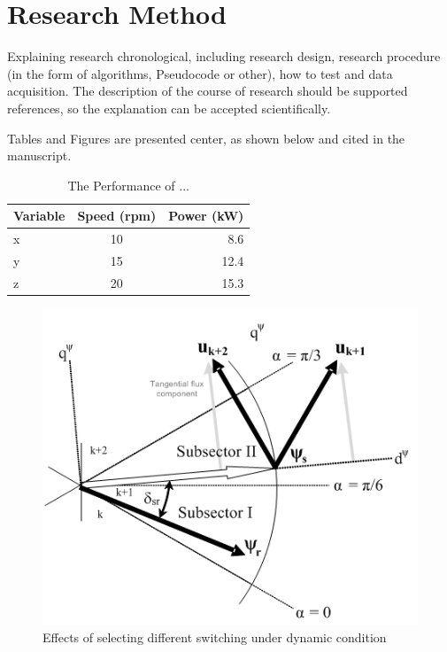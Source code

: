 \section{Research Method}
\label{ResearchMethod}
Explaining research chronological, including research design, research procedure (in the form of algorithms, Pseudocode or other), how to test and data acquisition. The description of the course of research should be supported references, so the explanation can be accepted scientifically.
\par
Tables and Figures are presented center, as shown below and cited in the manuscript.\\

\begin{table}[ht]
\caption{The Performance of ...}
\centering
\begin{tabular}{lcr}
\hline
Variable & Speed (rpm) & Power (kW) \\
\hline
x & 10 & 8.6 \\
y & 15 & 12.4 \\
z & 20 & 15.3 \\
\hline
\end{tabular}
\end{table}

\begin{figure}[ht]
\centering
\includegraphics[scale=0.5]{figures/figure1}
\caption{Effects of selecting different switching under dynamic condition}
\end{figure}